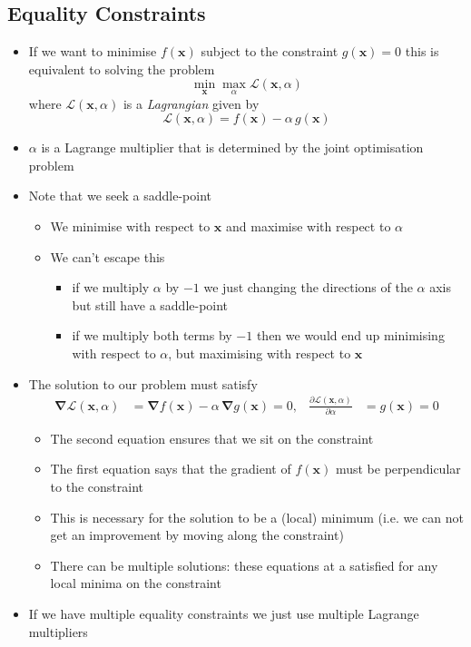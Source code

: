 \documentclass[11pt]{article}
\newcommand{\grad}{\bm{\nabla}}
\begin{document}
\subsection{Equality Constraints}
\label{sec:orgfbe3eef}
\begin{itemize}
\item If we want to minimise \(f(\bm{x})\) subject to the constraint
\(g(\bm{x})=0\) this is equivalent to solving the problem
$$ \min_{\bm{x}} \max_{\alpha} \mathcal{L}(\bm{x},\alpha) $$
where \(\mathcal{L}(\bm{x},\alpha)\) is a \emph{Lagrangian} given by
$$ \mathcal{L}(\bm{x},\alpha) = f(\bm{x}) - \alpha\,g(\bm{x}) $$
\item \(\alpha\) is a Lagrange multiplier that is determined by the joint
optimisation problem
\item Note that we seek a saddle-point
\begin{itemize}
\item We minimise with respect to \(\bm{x}\) and maximise with respect
to \(\alpha\)
\item We can't escape this
\begin{itemize}
\item if we multiply \(\alpha\) by \(-1\) we just changing the directions
of the \(\alpha\) axis but still have a saddle-point
\item if we multiply both terms by \(-1\) then we would end up
minimising with respect to \(\alpha\), but maximising with
respect to \(\bm{x}\)
\end{itemize}
\end{itemize}
\item The solution to our problem must satisfy
\begin{align*}
\grad  \mathcal{L}(\bm{x},\alpha) &=
\grad f(\bm{x}) - \alpha\,\grad g(\bm{x}) = 0, &
\frac{\partial \mathcal{L}(\bm{x},\alpha)}{\partial \alpha} &=
g(\bm{x}) = 0
\end{align*}
\begin{itemize}
\item The second equation ensures that we sit on the constraint
\item The first equation says that the gradient of \(f(\bm{x})\) must be
perpendicular to the constraint
\item This is necessary for the solution to be a (local) minimum
(i.e. we can not get an improvement by moving along the constraint)
\item There can be multiple solutions: these equations at a satisfied
for any local minima on the constraint
\end{itemize}
\item If we have multiple equality constraints we just use multiple
Lagrange multipliers
\end{itemize}
\end{document}
